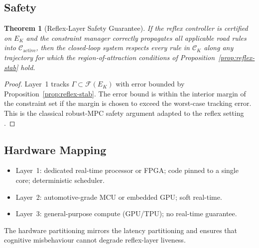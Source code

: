 \documentclass[11pt,twocolumn]{article}
\newtheorem{theorem}{Theorem}
\theoremstyle{definition}
\theoremstyle{remark}
\newcommand{\Feas}{\mathcal{F}}
\providecommand{\cC}{\mathcal{C}}
\begin{document}
\subsection{Safety}

\begin{theorem}[Reflex-Layer Safety Guarantee]\label{thm:safety}
If the reflex controller is certified on $E_K$ and the constraint manager correctly propagates all applicable road rules into $\cC_{\mathrm{active}}$, then the closed-loop system respects every rule in $\cC_K$ along any trajectory for which the region-of-attraction conditions of Proposition~\ref{prop:reflex-stab} hold.
\end{theorem}

\begin{proof}
Layer~1 tracks $\Gamma \subset \Feas(E_K)$ with error bounded by Proposition~\ref{prop:reflex-stab}. The error bound is within the interior margin of the constraint set if the margin is chosen to exceed the worst-case tracking error. This is the classical robust-MPC safety argument adapted to the reflex setting \cite{kelly2008controlvehicle,rosolia2019learning}.
\end{proof}

\subsection{Hardware Mapping}

\begin{itemize}[leftmargin=*,itemsep=2pt]
\item Layer~1: dedicated real-time processor or FPGA; code pinned to a single core; deterministic scheduler.
\item Layer~2: automotive-grade MCU or embedded GPU; soft real-time.
\item Layer~3: general-purpose compute (GPU/TPU); no real-time guarantee.
\end{itemize}

The hardware partitioning mirrors the latency partitioning and ensures that cognitive misbehaviour cannot degrade reflex-layer liveness.
\end{document}
